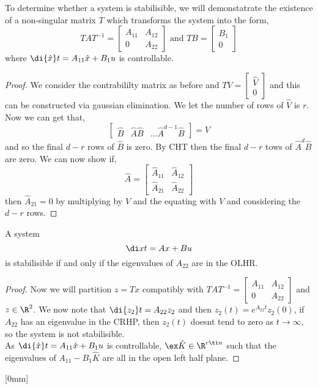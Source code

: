 To determine whether a system is stabilisible, we will demonstatrate the existence of a non-singular matrix $T$ which transforms the system into the form,
$$ TAT^{-1} = \begin{bmatrix}
  A_{11} & A_{12} \\ 0 & A_{22}
\end{bmatrix}  \text{ and } TB = \begin{bmatrix}
  B_1 \\ 0
\end{bmatrix}$$
where $\di {\hat x} t = A_{11}\hat x + B_1 u$ is controllable.

\begin{proof}
  We consider the contrabililty matrix as before and $TV = \begin{bmatrix}
    \hat V \\ 0
  \end{bmatrix}$ and this can be constructed via gaussian elimination. We let the number of rows of $\hat V$ is $r$. Now we can get that,
  $$ \begin{bmatrix}
    \hat B & \hat A\hat B & \dots \hat A^{d-1}\hat B
  \end{bmatrix} = V$$
  and so the final $d - r$ rows of $\hat B$ is zero. By CHT then the final $d - r$ tows of $\hat A^d \hat B$ are zero. We can now show if,
  $$ \hat A = \begin{bmatrix}
    \hat A_{11} & \hat A_{12}\\
    \hat A_{21} & \hat A_{22}
  \end{bmatrix} $$
  then $\hat A_{21} = 0$ by multiplying by $V$ and the equating with $V$ and considering the $d - r$ rows.
\end{proof}

\begin{nthm}
  A system
  $$ \di x t = Ax + Bu $$
  is stabilisible if and only if the eigenvalues of $A_{22}$ are in the OLHR.
\end{nthm}
\begin{proof}
  Now we will partition $z = Tx$ compatibly with $TAT^{-1} = \begin{bmatrix}
    A_{11} & A_{12} \\
    0 & A_{22}
  \end{bmatrix}$ and $z \in \R^2$. We now note that $\di {z_2} t = A_{22}z_2$ and then $z_2(t) = e^{A_{22}t}z_2(0)$, if $A_{22}$ has an eigenvalue in the CRHP, then $z_2(t)$ doesnt tend to zero as $t \to \infty$, so the system is not stabilisible.\\

  As $\di {\hat{x}} t = A_{11}\hat x + B_1u$ is controllable, $\ex \hat K \in \R^{r \ti n}$ such that the eigenvalues of $A_{11} - B_1\hat K$ are all in the open left half plane.
\end{proof}
[0mm]
